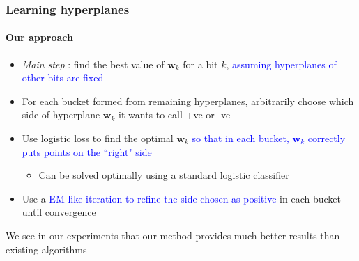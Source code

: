 \documentclass[usenames,dvipsnames, 11pt]{beamer}
\newlength{\wideitemsep}
\let\olditem\item
\renewcommand{\item}{\setlength{\itemsep}{\wideitemsep}\olditem}
\begin{document}
\begin{frame}
\frametitle{Learning hyperplanes}
\framesubtitle{Our approach}
\begin{itemize}
\pause
\item \emph{Main step} : find the best value of $\textbf{w}_k$ for a bit $k$, \textcolor{blue}{assuming hyperplanes of other bits are fixed} \vspace{1pt}
\pause
\item For each bucket formed from remaining hyperplanes, arbitrarily choose which side of hyperplane $\textbf{w}_k$ it wants to call +ve or -ve  \vspace{1pt}
\pause
\item Use logistic loss to find the optimal $\textbf{w}_k$ \textcolor{blue}{so that in each bucket, $\textbf{w}_k$ correctly puts points on the ``right" side}
\begin{itemize}
\item Can be solved optimally using a standard logistic classifier  
\end{itemize} \vspace{1pt}
\pause
\item Use a \textcolor{blue}{EM-like iteration to refine the side chosen as positive} in each bucket until convergence \vspace{1pt}
\end{itemize}
\pause
We see in our experiments that our method provides much better results than existing algorithms
\end{frame}

\end{document}
